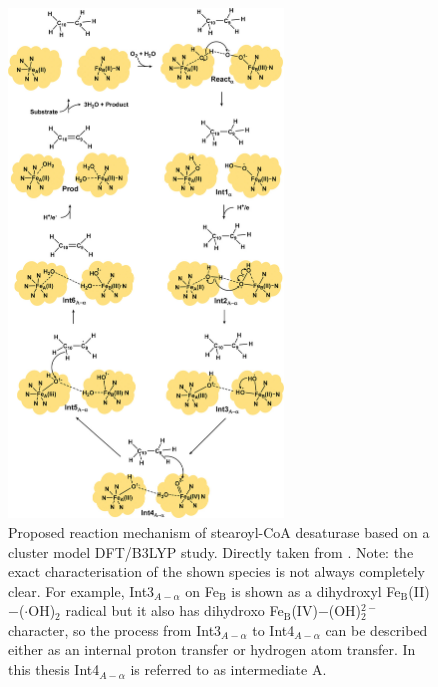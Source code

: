 \begin{figure}[htbp]
    \centering
    \includegraphics[width=0.65\textwidth]{Figures/Yu_mechanism.jpeg}
    \caption{Proposed reaction mechanism of stearoyl-CoA desaturase based on a cluster model DFT/B3LYP study. Directly taken from \cite{Yu2019}. Note: the exact characterisation of the shown species is not always completely clear. For example, Int3$_{A-\alpha}$ on Fe$_{\text{B}}$ is shown as a dihydroxyl Fe$_{\text{B}}$(II)$-$($\cdot$OH)$_2$ radical but it also has dihydroxo Fe$_{\text{B}}$(IV)$-$(OH)$_{2}^{2-}$ character, so the process from Int3$_{A-\alpha}$ to Int4$_{A-\alpha}$ can be described either as an internal proton transfer or hydrogen atom transfer. In this thesis Int4$_{A-\alpha}$ is referred to as intermediate A.}
    \label{fig:SCD1_mechanism}
\end{figure}


